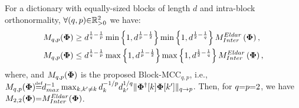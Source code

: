 \begin{property}
\label{prp:BMIC-MEldar} 
For a dictionary with equally-sized blocks of length $d$ and intra-block orthonormality, $\forall (q , p) {\in} \mathbb{R}^2_{{>} 0}$ we have:
\begin{gather*}
\begin{aligned}
&M_{q,p}(\boldsymbol{\Phi}) \geq d^{\frac1q - \frac1p} \min \left\lbrace 1 , d^{\frac1p - \frac{1}{2}} \right\rbrace \min \left\lbrace 1 , d^{\frac{1}{2} - \frac1q} \right\rbrace M^{Eldar}_{Inter}\left( \boldsymbol{\Phi} \right), \\
&M_{q,p}(\boldsymbol{\Phi}) \leq d^{\frac1q - \frac1p} \max \left\lbrace 1 , d^{\frac1p - \frac{1}{2}} \right\rbrace \max \left\lbrace 1 , d^{\frac{1}{2} - \frac1q} \right\rbrace M^{Eldar}_{Inter}\left( \boldsymbol{\Phi} \right),
\end{aligned}
\end{gather*}
where,  
and $M_{q,p}(\boldsymbol{\Phi})$ is the proposed Block-MCC$_{q,p}$, i.e., $M_{q,p}(\myPhi) {\myeq} d_{max}^{-1} \max_{k,k' \neq k} d_{k}^{-1/p} d_{k'}^{1/q} \Vert\myPhi^\dagger [k] \myPhi [k'] \Vert_{q \to p}$.
Then, for $q {=} p {=} 2$, we have $M_{2,2}(\boldsymbol{\Phi}) {=} M^{Eldar}_{Inter}(\boldsymbol{\Phi})$.
\end{property}
